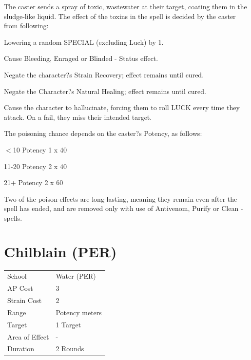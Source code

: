 \documentclass[11pt,a4paper,twocolumn]{book}
\begin{document}
	\medskip
	
	The caster sends a spray of toxic, wastewater at their target, coating them in the sludge-like liquid. The effect of the toxins in the spell is decided by the caster from following:
	
	\begin{compactitem}
		\item Lowering a random SPECIAL (excluding Luck) by 1.
		\item Cause Bleeding, Enraged or Blinded - Status effect.
		\item Negate the character?s Strain Recovery; effect remains until cured.
		\item Negate the Character?s Natural Healing; effect remains until cured.
		\item Cause the character to hallucinate, forcing them to roll LUCK every time they attack. On a fail, they miss their intended target.
	\end{compactitem}
	
	The poisoning chance depends on the caster?s Potency, as follows:
	
	\begin{compactitem}
		\item $<$10 Potency 		1 x 40%
		\item 11-20 Potency 		2 x 40%
		\item 21+ Potency 			2 x 60%
	\end{compactitem}

	Two of the poison-effects are long-lasting, meaning they remain even after the spell has ended, and are removed only with use of Antivenom, Purify or Clean -spells.
	
				\section*{Chilblain (PER)}
	{
		\begin{tabu} to 75mm{| X[l,4] | X[l,7] |}
			\hline
			School 			&  Water (PER)			\\
			AP Cost	      	&  3					\\
			Strain Cost     &  2					\\
			Range     		&  Potency meters		\\
			Target      	&  1 Target				\\
			Area of Effect  &  -	 				\\
			Duration     	&  2 Rounds				\\ \hline
		\end{tabu}
		
	}
	
\end{document}
